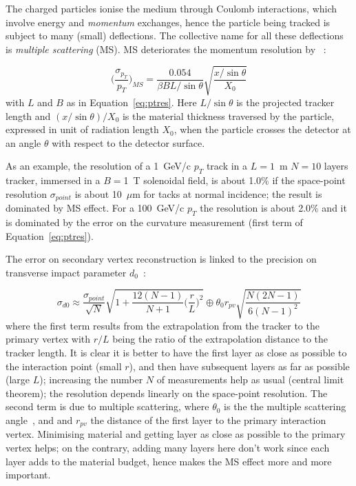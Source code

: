 The charged particles ionise the medium through Coulomb interactions, which involve energy and 
{\it momentum} exchanges, hence the particle being tracked is subject to many (small) deflections. 
The collective name for all these deflections is {\it multiple scattering} (MS). MS deteriorates the 
momentum resolution by ~\cite{Garcia-Sciveres:2017ymt}:

\begin{equation}
\Bigg(\dfrac{\sigma_{p_{T}}}{p_{T}}\Bigg)_{MS} = \dfrac{0.054}{\beta B L/\sin\theta}\sqrt{\dfrac{x/\sin\theta}{X_0}}
\label{eq:MS}
\end{equation} 
with $L$ and $B$ as in Equation~\ref{eq:ptres}. Here $L/\sin\theta$ is the projected tracker length
 and $(x/\sin\theta)/X_0$ is the material thickness traversed by the particle, expressed in unit 
 of radiation length $X_0$, when the particle crosses the detector at an angle $\theta$ with respect 
 to the detector surface.
 
 As an example, the resolution of a 1~GeV/c $p_T$ track in a $L=1$~m 
 $N=10$ layers 
 tracker, immersed in a $B=$1~T solenoidal field, is about 1.0\% if the space-point resolution   
 $\sigma_{point}$ is about 10~$\mu$m for tacks at normal incidence; the result is dominated by 
 MS effect. For a 100~GeV/c $p_T$ the resolution is about 2.0\% and it is dominated by the 
 error on the curvature measurement (first term of Equation~\ref{eq:ptres}).

The error on secondary vertex reconstruction is linked to the precision on 
transverse impact parameter $d_0$~\cite{Garcia-Sciveres:2017ymt}:

\begin{equation}
\sigma_{d0}\approx\dfrac{\sigma_{point}}{\sqrt{N}}\sqrt{1+\dfrac{12(N-1)}{N+1}\Big(\dfrac{r}{L}\Big)^2}\oplus\theta_0 r_{pv}\sqrt{\dfrac{N(2N-1)}{6(N-1)^2}}
\label{eq:d0res}
\end{equation} 
where the first term results from the extrapolation from the tracker to the primary vertex with $r/L$
being the ratio of the extrapolation distance to the tracker length. It is clear it is better to have 
the first layer as close as possible to the interaction point (small $r$), and then have 
subsequent layers as far as possible (large $L$); increasing the number $N$ of measurements 
help as usual (central limit theorem); the resolution depends 
linearly on the space-point resolution. The second term is due to multiple scattering, where 
$\theta_0$ is the the multiple scattering angle~\cite{Olive:2016xmw}, and and $r_{pv}$ the distance 
of the first  layer to the primary interaction vertex. Minimising material and getting layer as 
close as possible to the primary vertex helps; on the contrary, adding many layers here don't work 
since each layer adds to the material budget, hence makes the MS effect more and more important.


